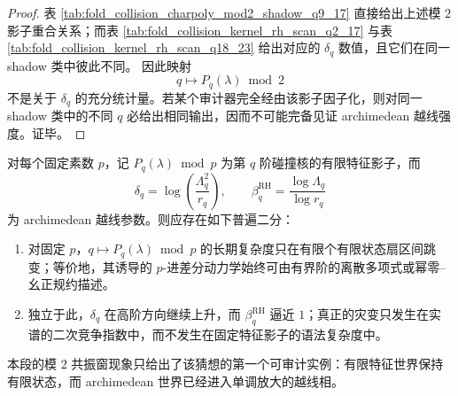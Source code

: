 \begin{proof}
表 \ref{tab:fold_collision_charpoly_mod2_shadow_q9_17} 直接给出上述模 \(2\) 影子重合关系；而表 \ref{tab:fold_collision_kernel_rh_scan_q2_17} 与表 \ref{tab:fold_collision_kernel_rh_scan_q18_23} 给出对应的 \(\delta_q\) 数值，且它们在同一 shadow 类中彼此不同。
因此映射
\[
q\longmapsto P_q(\lambda)\bmod 2
\]
不是关于 \(\delta_q\) 的充分统计量。若某个审计器完全经由该影子因子化，则对同一 shadow 类中的不同 \(q\) 必给出相同输出，因而不可能完备见证 archimedean 越线强度。证毕。
\end{proof}





\begin{conjecture}\label{conj:conclusion-fixed-characteristic-shadow-archimedean-splitting}
对每个固定素数 \(p\)，记 \(P_q(\lambda)\bmod p\) 为第 \(q\) 阶碰撞核的有限特征影子，而
\[
\delta_q=\log\!\left(\frac{\Lambda_q^2}{r_q}\right),
\qquad
\beta_q^{\mathrm{RH}}=\frac{\log\Lambda_q}{\log r_q}
\]
为 archimedean 越线参数。则应存在如下普遍二分：
\begin{enumerate}
  \item 对固定 \(p\)，\(q\mapsto P_q(\lambda)\bmod p\) 的长期复杂度只在有限个有限状态扇区间跳变；等价地，其诱导的 \(p\)-进差分动力学始终可由有界阶的离散多项式或幂零--幺正规约描述。
  \item 独立于此，\(\delta_q\) 在高阶方向继续上升，而 \(\beta_q^{\mathrm{RH}}\) 逼近 \(1\)；真正的灾变只发生在实谱的二次竞争指数中，而不发生在固定特征影子的语法复杂度中。
\end{enumerate}
本段的模 \(2\) 共振窗现象只给出了该猜想的第一个可审计实例：有限特征世界保持有限状态，而 archimedean 世界已经进入单调放大的越线相。
\end{conjecture}

